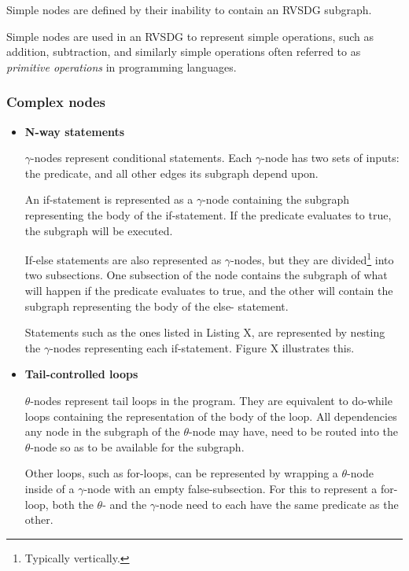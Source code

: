 Simple nodes are defined by their inability to contain an RVSDG subgraph.

Simple nodes are used in an RVSDG to represent simple operations, such as
addition, subtraction, and similarly simple operations often referred to as
\textit{primitive operations} in programming languages.

\subsubsection{Complex nodes}

\begin{itemize}

\item \textbf{N-way statements}

\textit{$\gamma$}-nodes represent conditional statements. Each $\gamma$-node has
two sets of inputs: the predicate, and all other edges its subgraph depend upon.

An if-statement is represented as a $\gamma$-node containing the subgraph
representing the body of the if-statement. If the predicate evaluates to true,
the subgraph will be executed.

If-else statements are also represented as $\gamma$-nodes, but they are
divided\footnote{Typically vertically.} into two subsections. One subsection of
the node contains the subgraph of what will happen if the predicate evaluates to
true, and the other will contain the subgraph representing the body of the else-
statement.

Statements such as the ones listed in Listing X, are
represented by nesting the $\gamma$-nodes representing each if-statement. Figure
 X illustrates this.


\item \textbf{Tail-controlled loops}

\textit{$\theta$}-nodes represent tail loops in the program. They are equivalent
to do-while loops containing the representation of the body of the loop. All
dependencies any node in the subgraph of the $\theta$-node may have, need to be
routed into the $\theta$-node so as to be available for the subgraph.

Other loops, such as for-loops, can be represented by wrapping a $\theta$-node
inside of a $\gamma$-node with an empty false-subsection. For this to represent
a for-loop, both the $\theta$- and the $\gamma$-node need to each have the same
predicate as the other.


\end{itemize}
